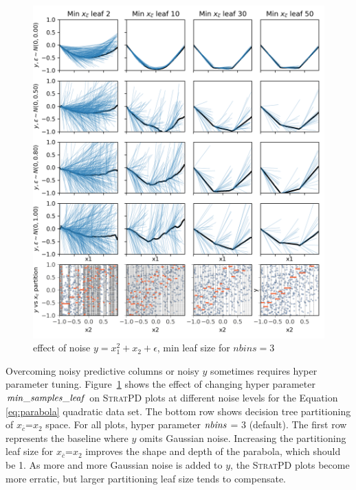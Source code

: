 \documentclass[12pt]{article}
\newcommand{\figref}[1]{Figure~\ref{#1}}
\newcommand{\spd}{\fontfamily{cmr}\textsc{\small StratPD}}
\newcommand{\xnc}{$x_{\overline{c}}$}
\begin{document}
\begin{figure}[htbp]
\begin{center}
\includegraphics[scale=0.7]{images/meta_additivity_noise.png}
\caption{effect of noise $y = x_1^2 + x_2 + \epsilon$, min leaf size for $nbins=3$}
\label{fig:meta_noise}
\end{center}
\end{figure}

Overcoming noisy predictive columns or noisy $y$ sometimes requires hyper parameter tuning. \figref{fig:meta_noise} shows the effect of changing hyper parameter ${\it min\_samples\_leaf}$ on \spd{} plots at different noise levels for the Equation \eqref{eq:parabola} quadratic data set. The bottom row shows decision tree partitioning of \xnc{}=$x_2$ space. For all plots, hyper parameter ${\it nbins}$ = 3 (default). The first row represents the baseline where $y$ omits Gaussian noise.  Increasing the partitioning leaf size for \xnc{}=$x_2$ improves the shape and depth of the parabola, which should be 1.  As more and more Gaussian noise is added to $y$, the \spd{} plots become more erratic, but larger partitioning leaf size tends to compensate.
\end{document}
